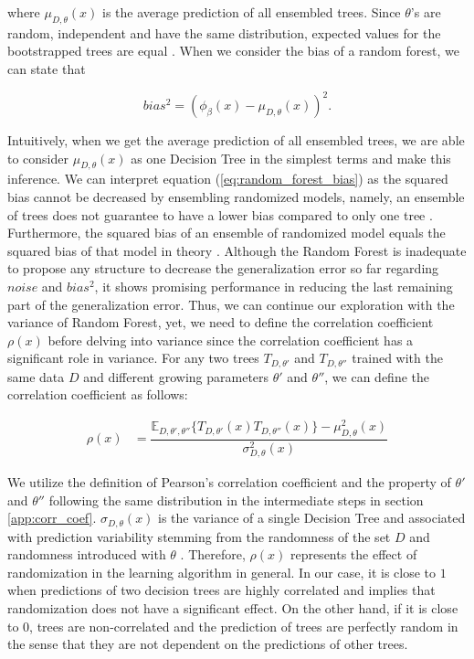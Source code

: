 where $\mu_{D,\theta}(x)$ is the average prediction of all ensembled trees. Since $\theta$'s are random, 
independent and have the same distribution, expected values for the bootstrapped trees are equal \cite{louppe2014understanding}. 
When we consider the bias of a random forest, we can state that

\begin{equation}\label{eq:random_forest_bias}
bias^2 = (\phi_{\beta}(x) - \mu_{D,\theta}(x))^2.
\end{equation}

Intuitively, when we get the average prediction of all ensembled trees, 
we are able to consider $\mu_{D,\theta}(x)$ as one Decision Tree in the simplest terms and make this inference.
We can interpret equation (\ref{eq:random_forest_bias}) as the squared bias 
cannot be decreased by ensembling randomized models, namely, 
an ensemble of trees does not guarantee to have a lower bias compared to only one tree \cite{friedman2001elements}. 
Furthermore, the squared bias of an ensemble of randomized model equals the squared bias of that model in theory \cite{louppe2014understanding}. 
Although the Random Forest is inadequate to propose any structure to decrease the generalization error so far regarding $noise$
and $bias^2$, it shows promising performance in reducing the last remaining part of the generalization error.
Thus, we can continue our exploration with the variance of Random Forest, yet, 
we need to define the correlation coefficient $\rho(x)$
before delving into variance since the correlation coefficient has a significant role in variance. 
For any two trees $T_{D,\theta'}$ and $T_{D,\theta''}$ trained with the same data $D$
and different growing parameters $\theta'$ and $\theta''$, we can define the correlation coefficient as follows:

\begin{align}
	\rho(x) & 
	= \dfrac{\mathbb{E}_{D,\theta',\theta''}\{T_{D,\theta'}(x) T_{D,\theta''}(x)\} 
	- \mu_{D,\theta}^2(x)}{\sigma_{D,\theta}^2(x)}
\end{align}

We utilize the definition of Pearson's correlation coefficient and the property of $\theta'$ and $\theta''$ following 
the same distribution in the intermediate steps in section \ref{app:corr_coef}. 
$\sigma_{D, \theta}(x)$ is the variance of a single Decision Tree and 
associated with prediction variability stemming from the randomness of the set $D$ 
and randomness introduced with $\theta$ \cite{louppe2014understanding}.
Therefore, $\rho(x)$ represents the effect of randomization in the learning algorithm in general.
In our case, it is close to $1$ when predictions of two decision trees are highly correlated and implies that randomization 
does not have a significant effect. 
On the other hand, if it is close to 0, trees are non-correlated and 
the prediction of trees are perfectly random in the sense that they are 
not dependent on the predictions of other trees. 

